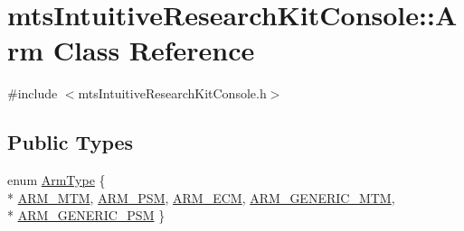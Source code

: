 \hypertarget{classmts_intuitive_research_kit_console_1_1_arm}{}\section{mts\+Intuitive\+Research\+Kit\+Console\+:\+:Arm Class Reference}
\label{classmts_intuitive_research_kit_console_1_1_arm}


{\ttfamily \#include $<$mts\+Intuitive\+Research\+Kit\+Console.\+h$>$}

\subsection*{Public Types}
\begin{DoxyCompactItemize}
\item 
enum \hyperlink{classmts_intuitive_research_kit_console_1_1_arm_acb898ba65d323f59ffd0885a47ef6cec}{Arm\+Type} \{ \\*
\hyperlink{classmts_intuitive_research_kit_console_1_1_arm_acb898ba65d323f59ffd0885a47ef6ceca925a57962bd2e8f0d5c69149ede508c8}{A\+R\+M\+\_\+\+M\+T\+M}, 
\hyperlink{classmts_intuitive_research_kit_console_1_1_arm_acb898ba65d323f59ffd0885a47ef6ceca209dc5ec65dd5a23a2792dea8d951daf}{A\+R\+M\+\_\+\+P\+S\+M}, 
\hyperlink{classmts_intuitive_research_kit_console_1_1_arm_acb898ba65d323f59ffd0885a47ef6cecaf2778d3b94620ba8ca327ad7c04babd3}{A\+R\+M\+\_\+\+E\+C\+M}, 
\hyperlink{classmts_intuitive_research_kit_console_1_1_arm_acb898ba65d323f59ffd0885a47ef6ceca6c2d93bfad70b962325393b347fa01dc}{A\+R\+M\+\_\+\+G\+E\+N\+E\+R\+I\+C\+\_\+\+M\+T\+M}, 
\\*
\hyperlink{classmts_intuitive_research_kit_console_1_1_arm_acb898ba65d323f59ffd0885a47ef6ceca522dcd62e40a468a089d7a884df12f90}{A\+R\+M\+\_\+\+G\+E\+N\+E\+R\+I\+C\+\_\+\+P\+S\+M}
 \}
\end{DoxyCompactItemize}
